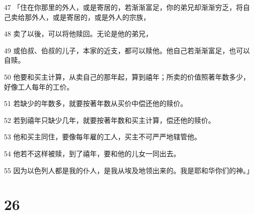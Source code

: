 \par 47 「住在你那里的外人，或是寄居的，若渐渐富足，你的弟兄却渐渐穷乏，将自己卖给那外人，或是寄居的，或是外人的宗族，
\par 48 卖了以後，可以将他赎回。无论是他的弟兄，
\par 49 或伯叔、伯叔的儿子，本家的近支，都可以赎他。他自己若渐渐富足，也可以自赎。
\par 50 他要和买主计算，从卖自己的那年起，算到禧年；所卖的价值照著年数多少，好像工人每年的工价。
\par 51 若缺少的年数多，就要按著年数从买价中偿还他的赎价。
\par 52 若到禧年只缺少几年，就要按著年数和买主计算，偿还他的赎价。
\par 53 他和买主同住，要像每年雇的工人，买主不可严严地辖管他。
\par 54 他若不这样被赎，到了禧年，要和他的儿女一同出去。
\par 55 因为以色列人都是我的仆人，是我从埃及地领出来的。我是耶和华你们的神。」

\chapter{26}

